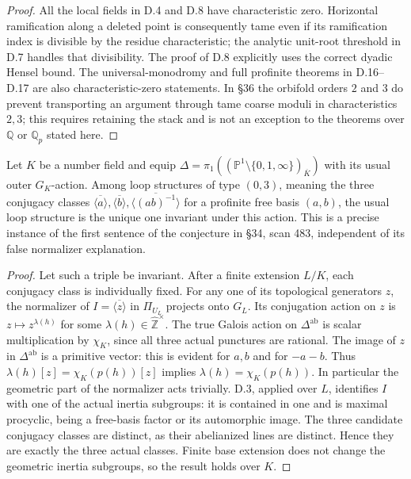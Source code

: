 \begin{proof}
All the local fields in D.4 and D.8 have characteristic zero.  Horizontal
ramification along a deleted point is consequently tame even if its
ramification index is divisible by the residue characteristic; the analytic
unit-root threshold in D.7 handles that divisibility.  The proof of D.8
explicitly uses the correct dyadic Hensel bound.  The universal-monodromy
and full profinite theorems in D.16--D.17 are also characteristic-zero
statements.  In \S36 the orbifold orders $2$ and $3$ do prevent transporting
an argument through tame coarse moduli in characteristics $2,3$; this
requires retaining the stack and is not an exception to the theorems over
$\mathbb Q$ or $\mathbb Q_p$ stated here.
\end{proof}

Let $K$ be a number field and equip
$\Delta=\pi_1((\mathbb P^1\setminus\{0,1,\infty\})_{\overline K})$
with its usual outer $G_K$-action.  Among loop structures of type $(0,3)$,
meaning the three conjugacy classes
$\overline{\langle a\rangle},\overline{\langle b\rangle},
\overline{\langle (ab)^{-1}\rangle}$ for a profinite free basis $(a,b)$,
the usual loop structure is the unique one invariant under this action.
This is a precise instance of the first sentence of the conjecture in
\S34, scan 483, independent of its false normalizer explanation.
\begin{proof}
Let such a triple be invariant.  After a finite extension $L/K$, each
conjugacy class is individually fixed.  For any one of its topological
generators $z$, the normalizer of $I=\overline{\langle z\rangle}$ in
$\Pi_{U_L}$ projects onto $G_L$.  Its conjugation action on $z$ is
$z\mapsto z^{\lambda(h)}$ for some
$\lambda(h)\in\widehat{\mathbb Z}^{\times}$.
The true Galois action on $\Delta^{\mathrm{ab}}$ is scalar multiplication
by $\chi_K$, since all three actual punctures are rational.  The image of
$z$ in $\Delta^{\mathrm{ab}}$ is a primitive vector: this is evident for
$a,b$ and for $-a-b$.  Thus
$\lambda(h)[z]=\chi_K(p(h))[z]$ implies
$\lambda(h)=\chi_K(p(h))$.  In particular the geometric part of the
normalizer acts trivially.  D.3, applied over $L$, identifies $I$ with
one of the actual inertia subgroups: it is contained in one and is maximal
procyclic, being a free-basis factor or its automorphic image.
The three candidate conjugacy classes are distinct, as their abelianized
lines are distinct.  Hence they are exactly the three actual classes.
Finite base extension does not change the geometric inertia subgroups,
so the result holds over $K$.
\end{proof}

